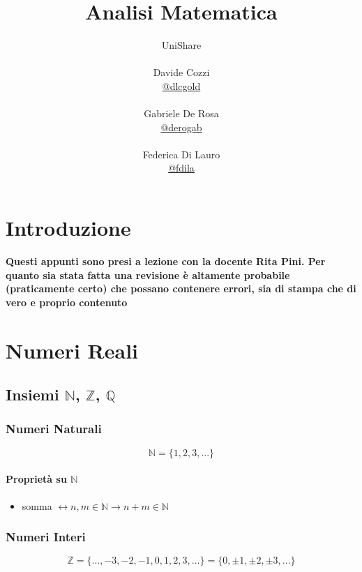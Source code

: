 \documentclass[a4paper,12pt, oneside]{book}
\title{Analisi Matematica}
\author{UniShare\\\\Davide Cozzi\\\href{https://t.me/dlcgold}{@dlcgold}\\\\Gabriele De Rosa\\\href{https://t.me/derogab}{@derogab} \\\\Federica Di Lauro\\\href{https://t.me/f_dila}{@f\textunderscore dila}}
\date{}
\begin{document}
\maketitle


\newtheorem{teorema}{Teorema}
\newtheorem{definizione}{Definizione}
\newtheorem{esempio}{Esempio}
\newtheorem{corollario}{Corollario}
\newtheorem{lemma}{Lemma}
\newtheorem{osservazione}{Osservazione}
\newtheorem{nota}{Nota}
\tableofcontents
\renewcommand{\chaptermark}[1]{%
\markboth{\chaptername
\ \thechapter.\ #1}{}}
\renewcommand{\sectionmark}[1]{\markright{\thesection.\ #1}}
\chapter{Introduzione}
\textbf{Questi appunti sono presi a lezione con la docente Rita Pini. Per quanto sia stata fatta una revisione è altamente probabile (praticamente certo) che possano contenere errori, sia di stampa che di vero e proprio contenuto}

\chapter{Numeri Reali}
\section{Insiemi $\mathbb{N}$, $\mathbb{Z}$, $\mathbb{Q}$}
\subsection{Numeri Naturali}
\begin{equation}
	\mathbb{N}=\{1,2,3,...\}
\end{equation}
\subsubsection{Proprietà su $\mathbb{N}$}
\begin{itemize}
\item somma $\longleftrightarrow n,m \in \mathbb{N} \rightarrow  n+m \in \mathbb{N}$
\end{itemize}
\subsection{Numeri Interi}
\begin{equation}
	\mathbb{Z}=\{...,-3,-2,-1,0,1,2,3,...\}=\{0,\pm 1,\pm 2,\pm 3,...\}
\end{equation}
\end{document}
